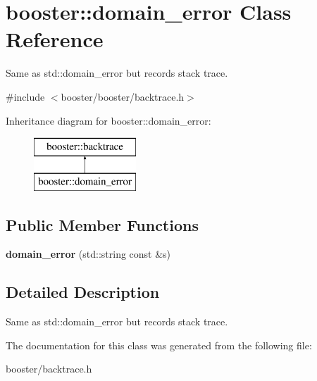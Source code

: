 \section{booster\-:\-:domain\-\_\-error \-Class \-Reference}
\label{classbooster_1_1domain__error}


\-Same as std\-::domain\-\_\-error but records stack trace.  




{\ttfamily \#include $<$booster/booster/backtrace.\-h$>$}

\-Inheritance diagram for booster\-:\-:domain\-\_\-error\-:\begin{figure}[H]
\begin{center}
\leavevmode
\includegraphics[height=2.000000cm]{classbooster_1_1domain__error}
\end{center}
\end{figure}
\subsection*{\-Public \-Member \-Functions}
\begin{DoxyCompactItemize}
\item 
{\bfseries domain\-\_\-error} (std\-::string const \&s)\label{classbooster_1_1domain__error_a06047ee402ac045abc0b6c3ef432ea06}

\end{DoxyCompactItemize}


\subsection{\-Detailed \-Description}
\-Same as std\-::domain\-\_\-error but records stack trace. 

\-The documentation for this class was generated from the following file\-:\begin{DoxyCompactItemize}
\item 
booster/backtrace.\-h\end{DoxyCompactItemize}

